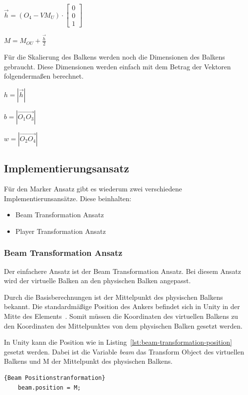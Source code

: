 $\vec{h} = (O_{4} - VM_{U}) \cdot \begin{bmatrix} 0 \\ 0 \\ 1  \end{bmatrix}$

$M = M_{OU} + \frac{\vec{h}}{2}$

Für die Skalierung des Balkens werden noch die Dimensionen des Balkens gebraucht.
Diese Dimensionen werden einfach mit dem Betrag der Vektoren folgendermaßen berechnet.

$h = |\vec{h}|$

$b = |\vec{O_{1}O_{3}}|$

$w = |\vec{O_{2}O_{4}}|$

\subsection{Implementierungsansatz}
\label{subsec:implementierungsansatz}

Für den Marker Ansatz gibt es wiederum zwei verschiedene Implementierunsansätze.
Diese beinhalten:

\begin{itemize}
    \item Beam Transformation Ansatz
    \item Player Transformation Ansatz
\end{itemize}

\subsubsection{Beam Transformation Ansatz}

Der einfachere Ansatz ist der Beam Transformation Ansatz.
Bei diesem Ansatz wird der virtuelle Balken an den physischen Balken angepasst.

Durch die Basisberechnungen ist der Mittelpunkt des physischen Balkens bekannt.
Die standardmäßige Position des Ankers befindet sich in Unity in der Mitte des Elements~\cite{AM_APPS_2020}.
Somit müssen die Koordinaten des virtuellen Balkens zu den Koordinaten des Mittelpunktes von dem physischen Balken gesetzt werden.

In Unity kann die Position wie in Listing~\ref{lst:beam-transformation-position} gesetzt werden.
Dabei ist die Variable \emph{beam} das Transform Object des virtuellen Balkens und M der Mittelpunkt des physischen Balkens.


\begin{lstlisting}[language={[Sharp]C},label={lst:beam-transformation-position}, caption={Beam Positionstranformation}]{Beam Positionstranformation}
    beam.position = M;
\end{lstlisting}

